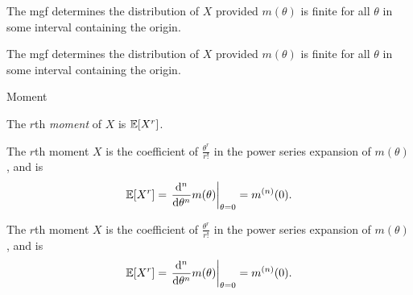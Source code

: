 \begin{note}
  \begin{field}
    \begin{thm}
      The mgf determines the distribution of $X$ provided $m(\theta)$ is finite for all $\theta$ in some interval containing the origin.
    \end{thm}
  \end{field}
  \begin{field}
    \begin{thm}
      The mgf determines the distribution of $X$ provided $m(\theta)$ is finite for all $\theta$ in some interval containing the origin.
    \end{thm}
  \end{field}
  \xplain{}%
\end{note}

%
\begin{note}
  \begin{field}
    Moment
  \end{field}
  \begin{field}
    \begin{defi}[Moment]
      The $r$th \emph{moment} of $X$ is $\mathbb{E}[X^r]$.
    \end{defi}
  \end{field}
  \xplain{}%
\end{note}

\begin{note}
  \begin{field}
    \begin{thm}
      The $r$th moment $X$ is the coefficient of $\frac{\theta^r}{r!}$ in the power series expansion of $m(\theta)$, and is
      \[
        \mathbb{E}[X^r] = \left.\frac{\mathrm{d} ^n}{\mathrm{d} \theta^n}m(\theta)\right|_{\theta = 0} = m^{(n)}(0).
      \]
    \end{thm}
  \end{field}
  \begin{field}
    \begin{thm}
      The $r$th moment $X$ is the coefficient of $\frac{\theta^r}{r!}$ in the power series expansion of $m(\theta)$, and is
      \[
        \mathbb{E}[X^r] = \left.\frac{\mathrm{d} ^n}{\mathrm{d} \theta^n}m(\theta)\right|_{\theta = 0} = m^{(n)}(0).
      \]
    \end{thm}
  \end{field}
  \xplain{}%
\end{note}

